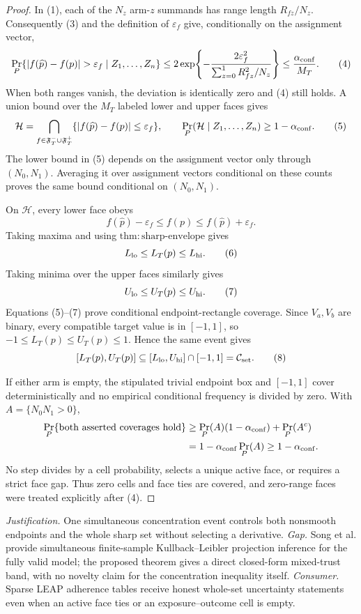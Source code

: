 \documentclass{article}
\begin{document}
\begin{proof}
In (1), each of the \(N_z\) arm-\(z\) summands has range length
\(R_{fz}/N_z\).  Consequently (3) and the definition of \(\varepsilon_f\)
give, conditionally on the assignment vector,
\[
 \Pr_P\{|f(\widehat p)-f(p)|>\varepsilon_f\mid Z_1,\ldots,Z_n\}
 \le
 2\exp\!\left\{-\frac{2\varepsilon_f^2}
 {\sum_{z=0}^1R_{fz}^2/N_z}\right\}
 \le\frac{\alpha_{\rm conf}}{M_T}. \tag{4}
\]
When both ranges vanish, the deviation is identically zero and (4) still
holds.  A union bound over the \(M_T\) labeled lower and upper faces gives
\[
 \mathcal H=
 \bigcap_{f\in\mathfrak F^-_T\cup\mathfrak F^+_T}
 \{|f(\widehat p)-f(p)|\le\varepsilon_f\},
 \qquad
 \Pr_P(\mathcal H\mid Z_1,\ldots,Z_n)\ge1-\alpha_{\rm conf}. \tag{5}
\]
The lower bound in (5) depends on the assignment vector only through
\((N_0,N_1)\).  Averaging it over assignment vectors conditional on these
counts proves the same bound conditional on \((N_0,N_1)\).

On \(\mathcal H\), every lower face obeys
\[
 f(\widehat p)-\varepsilon_f\le f(p)
 \le f(\widehat p)+\varepsilon_f.
\]
Taking maxima and using \(\mathrm{thm{:}sharp\mbox{-}envelope}\) gives
\[
 L_{\rm lo}\le L_T(p)\le L_{\rm hi}. \tag{6}
\]
Taking minima over the upper faces similarly gives
\[
 U_{\rm lo}\le U_T(p)\le U_{\rm hi}. \tag{7}
\]
Equations (5)--(7) prove conditional endpoint-rectangle coverage.  Since
\(V_a,V_b\) are binary, every compatible target value is in \([-1,1]\), so
\(-1\le L_T(p)\le U_T(p)\le1\).  Hence the same event gives
\[
 [L_T(p),U_T(p)]
 \subseteq[L_{\rm lo},U_{\rm hi}]\cap[-1,1]
 =\mathcal C_{\rm set}. \tag{8}
\]

If either arm is empty, the stipulated trivial endpoint box and
\([-1,1]\) cover deterministically and no empirical conditional frequency
is divided by zero.  With \(A=\{N_0N_1>0\}\),
\[
\begin{aligned}
 \Pr_P\{\text{both asserted coverages hold}\}
 &\ge \Pr_P(A)(1-\alpha_{\rm conf})+\Pr_P(A^c)\\
 &=1-\alpha_{\rm conf}\Pr_P(A)\ge1-\alpha_{\rm conf}.
\end{aligned}
\]
No step divides by a cell probability, selects a unique active face, or
requires a strict face gap.  Thus zero cells and face ties are covered, and
zero-range faces were treated explicitly after (4).
\end{proof}
\par\smallskip\noindent \textit{Justification.} One simultaneous concentration event controls both nonsmooth endpoints and the whole sharp set without selecting a derivative. \textit{Gap.} Song et al. provide simultaneous finite-sample Kullback--Leibler projection inference for the fully valid model; the proposed theorem gives a direct closed-form mixed-trust band, with no novelty claim for the concentration inequality itself. \textit{Consumer.} Sparse LEAP adherence tables receive honest whole-set uncertainty statements even when an active face ties or an exposure--outcome cell is empty.
\end{document}

